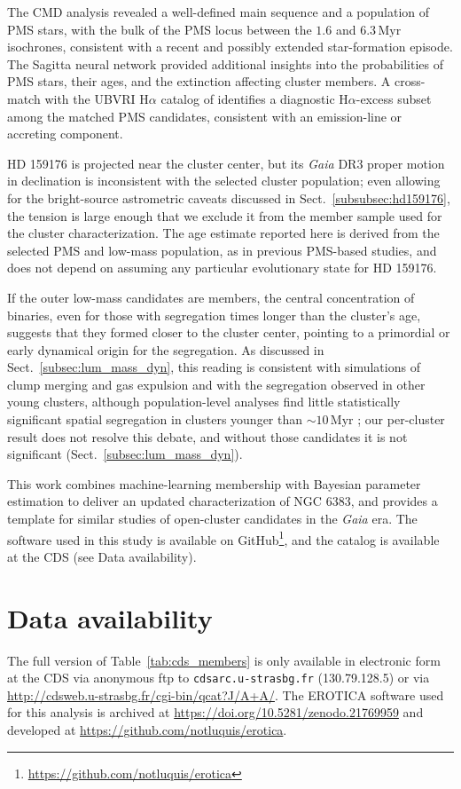\documentclass{aa}
\begin{document}
The CMD analysis revealed a well-defined main sequence and a population of PMS stars, with the bulk of the PMS locus between the $1.6$ and $6.3\,\mathrm{Myr}$ isochrones, consistent with a recent and possibly extended star-formation episode. The Sagitta neural network provided additional insights into the probabilities of PMS stars, their ages, and the extinction affecting cluster members. A cross-match with the UBVRI H$\alpha$ catalog of \citet{2010AA...511A..25R} identifies a diagnostic H$\alpha$-excess subset among the matched PMS candidates, consistent with an emission-line or accreting component.

HD 159176 is projected near the cluster center, but its \textit{Gaia} DR3 proper motion in declination is inconsistent with the selected cluster population; even allowing for the bright-source astrometric caveats discussed in Sect.~\ref{subsubsec:hd159176}, the tension is large enough that we exclude it from the member sample used for the cluster characterization. The age estimate reported here is derived from the selected PMS and low-mass population, as in previous PMS-based studies, and does not depend on assuming any particular evolutionary state for HD 159176.

If the outer low-mass candidates are members, the central concentration of binaries, even for those with segregation times longer than the cluster's age, suggests that they formed closer to the cluster center, pointing to a primordial or early dynamical origin for the segregation. As discussed in Sect.~\ref{subsec:lum_mass_dyn}, this reading is consistent with simulations of clump merging and gas expulsion and with the segregation observed in other young clusters, although population-level analyses find little statistically significant spatial segregation in clusters younger than $\sim10\,\mathrm{Myr}$ \citep{2026AJ....171..236Z}; our per-cluster result does not resolve this debate, and without those candidates it is not significant (Sect.~\ref{subsec:lum_mass_dyn}).

This work combines machine-learning membership with Bayesian parameter estimation to deliver an updated characterization of NGC 6383, and provides a template for similar studies of open-cluster candidates in the \textit{Gaia} era. The software used in this study is available on GitHub\footnote{\href{https://github.com/notluquis/erotica}{https://github.com/notluquis/erotica}}, and the catalog is available at the CDS (see Data availability).

\section*{Data availability}
The full version of Table~\ref{tab:cds_members} is only available in electronic form at the CDS via anonymous ftp to \texttt{cdsarc.u-strasbg.fr} (130.79.128.5) or via \url{http://cdsweb.u-strasbg.fr/cgi-bin/qcat?J/A+A/}. The EROTICA software used for this analysis is archived at \url{https://doi.org/10.5281/zenodo.21769959} and developed at \url{https://github.com/notluquis/erotica}.
\end{document}
